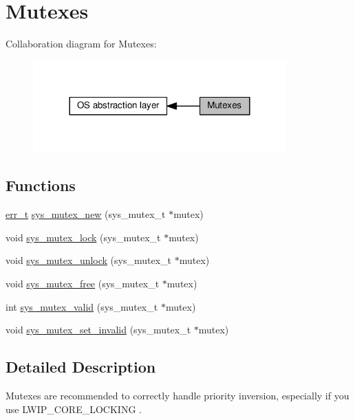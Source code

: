 \hypertarget{group__sys__mutex}{}\section{Mutexes}
\label{group__sys__mutex}
Collaboration diagram for Mutexes\+:
\nopagebreak
\begin{figure}[H]
\begin{center}
\leavevmode
\includegraphics[width=276pt]{group__sys__mutex}
\end{center}
\end{figure}
\subsection*{Functions}
\begin{DoxyCompactItemize}
\item 
\hyperlink{group__infrastructure__errors_gaf02d9da80fd66b4f986d2c53d7231ddb}{err\+\_\+t} \hyperlink{group__sys__mutex_ga38e7dae1fd88b338eb1cd97f110f3897}{sys\+\_\+mutex\+\_\+new} (sys\+\_\+mutex\+\_\+t $\ast$mutex)
\item 
void \hyperlink{group__sys__mutex_ga4d4eb9afe5965fa2661dd54ff55d616a}{sys\+\_\+mutex\+\_\+lock} (sys\+\_\+mutex\+\_\+t $\ast$mutex)
\item 
void \hyperlink{group__sys__mutex_ga5568f68898fe9d5735f9ce2f665624fb}{sys\+\_\+mutex\+\_\+unlock} (sys\+\_\+mutex\+\_\+t $\ast$mutex)
\item 
void \hyperlink{group__sys__mutex_ga16336ce68b741e98204102ca4bc84dd9}{sys\+\_\+mutex\+\_\+free} (sys\+\_\+mutex\+\_\+t $\ast$mutex)
\item 
int \hyperlink{group__sys__mutex_gaebe83ba90a6d9c23cdb3eb5d49562c4a}{sys\+\_\+mutex\+\_\+valid} (sys\+\_\+mutex\+\_\+t $\ast$mutex)
\item 
void \hyperlink{group__sys__mutex_ga3f392725971dc837aa56dd7e45fa7ca8}{sys\+\_\+mutex\+\_\+set\+\_\+invalid} (sys\+\_\+mutex\+\_\+t $\ast$mutex)
\end{DoxyCompactItemize}


\subsection{Detailed Description}
Mutexes are recommended to correctly handle priority inversion, especially if you use L\+W\+I\+P\+\_\+\+C\+O\+R\+E\+\_\+\+L\+O\+C\+K\+I\+NG . 

